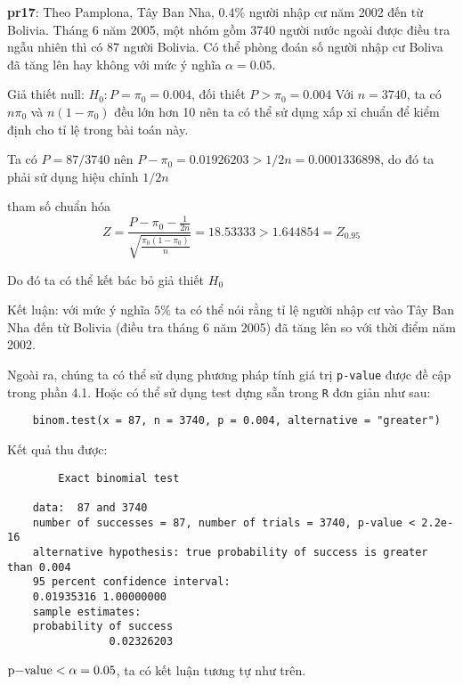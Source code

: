 \textbf{pr17}: Theo Pamplona, Tây Ban Nha, $0.4\%$ người nhập cư năm 2002 đến từ Bolivia.
Tháng 6 năm 2005, một nhóm gồm 3740 người nước ngoài được điều tra ngẫu nhiên thì có 87 người 
Bolivia. Có thể phòng đoán số người nhập cư Boliva đã tăng lên hay không với mức ý nghĩa $\alpha = 0.05$.

Giả thiết null: $H_0: P = \pi_0 = 0.004$, đối thiết $P > \pi_0 = 0.004$
Với $n = 3740$, ta có $n\pi_0$ và $n(1 - \pi_0)$ đều lớn hơn 10 nên ta có thể sử dụng xấp xỉ chuẩn 
để kiểm định cho tỉ lệ trong bài toán này.

Ta có $P = 87/3740$ nên $P - \pi_0 = 0.01926203 > 1/2n = 0.0001336898$, do đó ta phải sử dụng hiệu chỉnh $1/2n$

tham số chuẩn hóa 
$$Z = \frac{P - \pi_0 - \frac{1}{2n}}{\sqrt{\frac{\pi_0(1 - \pi_0)}{n}}} = 18.53333 > 1.644854 = Z_{0.95}$$

Do đó ta có thể kết bác bỏ giả thiết $H_0$

Kết luận: với mức ý nghĩa $5\%$ ta có thể nói rằng tỉ lệ người nhập cư vào Tây Ban Nha đến từ Bolivia (điều tra tháng 6 năm 2005)
đã tăng lên so với thời điểm năm 2002.

Ngoài ra, chúng ta có thể sử dụng phương pháp tính giá trị \lstinline{p-value} được đề cập trong phần 4.1.
Hoặc có thể sử dụng test dựng sẵn trong \lstinline{R} đơn giản như sau:

\begin{lstlisting}
    binom.test(x = 87, n = 3740, p = 0.004, alternative = "greater")
\end{lstlisting}

Kết quả thu được:

\begin{lstlisting}
        Exact binomial test

    data:  87 and 3740
    number of successes = 87, number of trials = 3740, p-value < 2.2e-16
    alternative hypothesis: true probability of success is greater than 0.004
    95 percent confidence interval:
    0.01935316 1.00000000
    sample estimates:
    probability of success 
                0.02326203 
\end{lstlisting}

$\text{\lstinline{p-value}} < \alpha = 0.05$, ta có kết luận tương tự như trên.